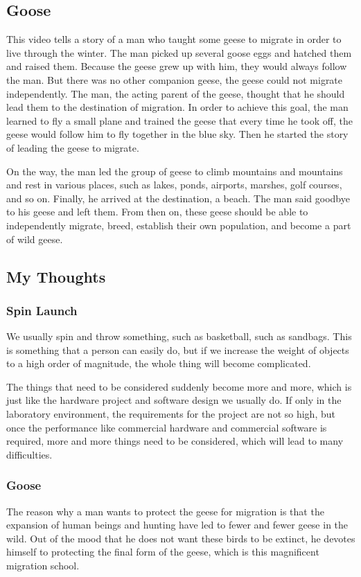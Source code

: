 \documentclass{article}
\begin{document}
\subsection{Goose}
This video tells a story of a man who taught some geese to migrate in order to live through the winter. The man picked up several goose eggs and hatched them and raised them. Because the geese grew up with him, they would always follow the man. But there was no other companion geese, the geese could not migrate independently. The man, the acting parent of the geese, thought that he should lead them to the destination of migration. In order to achieve this goal, the man learned to fly a small plane and trained the geese that every time he took off, the geese would follow him to fly together in the blue sky. Then he started the story of leading the geese to migrate.

On the way, the man led the group of geese to climb mountains and mountains and rest in various places, such as lakes, ponds, airports, marshes, golf courses, and so on. Finally, he arrived at the destination, a beach. The man said goodbye to his geese and left them. From then on, these geese should be able to independently migrate, breed, establish their own population, and become a part of wild geese.


\subsection{My Thoughts}

\subsubsection{Spin Launch}
We usually spin and throw something, such as basketball, such as sandbags. This is something that a person can easily do, but if we increase the weight of objects to a high order of magnitude, the whole thing will become complicated.

The things that need to be considered suddenly become more and more, which is just like the hardware project and software design we usually do. If only in the laboratory environment, the requirements for the project are not so high, but once the performance like commercial hardware and commercial software is required, more and more things need to be considered, which will lead to many difficulties.

\subsubsection{Goose}
The reason why a man wants to protect the geese for migration is that the expansion of human beings and hunting have led to fewer and fewer geese in the wild. Out of the mood that he does not want these birds to be extinct, he devotes himself to protecting the final form of the geese, which is this magnificent migration school.
\end{document}
